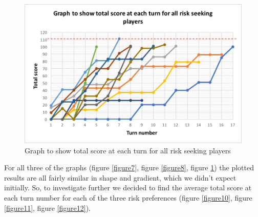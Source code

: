 \documentclass[a4paper,titlepage]{article}
\begin{document}
\begin{figure}
\center
\includegraphics[scale=1]{seeking_graph}
\caption{Graph to show total score at each turn for all risk seeking players\label{figure9}}
\end{figure}
For all three of the graphs (figure \ref{figure7}, figure \ref{figure8}, figure \ref{figure9}) the plotted results are all fairly similar in shape and gradient, which we didn’t expect initially. So, to investigate further we decided to find the average total score at each turn number for each of the three risk preferences (figure \ref{figure10}, figure \ref{figure11}, figure \ref{figure12}).
\end{document}
